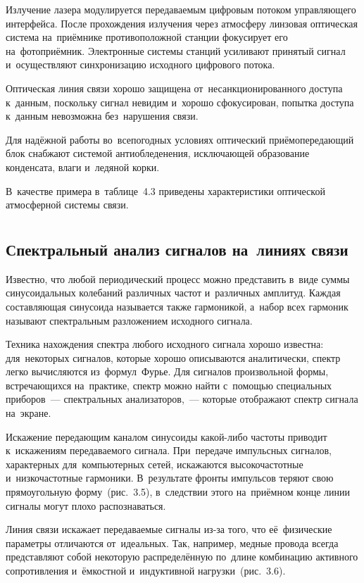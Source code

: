 \documentclass[
	a4paper,
	oneside,
	BCOR = 10mm,
	DIV = 12,
	12pt,
	headings = normal,
]{scrartcl}
\begin{document}
				Излучение лазера модулируется передаваемым цифровым потоком управляющего интерфейса. После прохождения излучения через атмосферу линзовая оптическая система на~приёмнике противоположной станции фокусирует его на~фотоприёмник. Электронные системы станций усиливают принятый сигнал и~осуществляют синхронизацию исходного цифрового потока.

				Оптическая линия связи хорошо защищена от~несанкционированного доступа к~данным, поскольку сигнал невидим и~хорошо сфокусирован, попытка доступа к~данным невозможна без~нарушения связи.

				Для надёжной работы во~всепогодных условиях оптический приёмопередающий блок снабжают системой антиобледенения, исключающей образование конденсата, влаги и~ледяной корки. 

				В~качестве примера в~таблице~4.3 приведены характеристики оптической атмосферной системы связи. 

		\section{}
			\subsection{Спектральный анализ сигналов на~линиях связи}
				Известно, что любой периодический процесс можно представить в~виде суммы синусоидальных колебаний различных частот и~различных амплитуд. Каждая составляющая синусоида называется также гармоникой, а~набор всех гармоник называют спектральным разложением исходного сигнала. 

				Техника нахождения спектра любого исходного сигнала хорошо известна: для~некоторых сигналов, которые хорошо описываются аналитически, спектр легко вычисляются из~формул~Фурье. Для сигналов произвольной формы, встречающихся на~практике, спектр можно найти с~помощью специальных приборов~— спектральных анализаторов,~— которые отображают спектр сигнала на~экране.

				Искажение передающим каналом синусоиды какой-либо частоты приводит к~искажениям передаваемого сигнала. При~передаче импульсных сигналов, характерных для~компьютерных сетей, искажаются высокочастотные и~низкочастотные гармоники. В~результате фронты импульсов теряют свою прямоугольную форму~(рис.~3.5), в~следствии этого на~приёмном конце линии сигналы могут плохо распознаваться.

				Линия связи искажает передаваемые сигналы из-за того, что её~физические параметры отличаются от~идеальных. Так, например, медные провода всегда представляют собой некоторую распределённую по~длине комбинацию активного сопротивления и~ёмкостной и~индуктивной нагрузки~(рис.~3.6).
\end{document}
